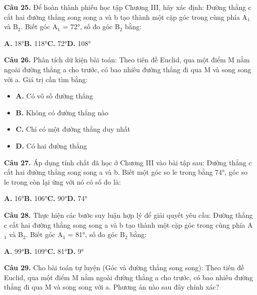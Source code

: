 \documentclass[11pt,a4paper]{article}
\begin{document}
\textbf{\color{primary} Câu 25.} Để hoàn thành phiếu học tập Chương III, hãy xác định: Đường thẳng c cắt hai đường thẳng song song a và b tạo thành một cặp góc trong cùng phía A$_1$ và B$_2$. Biết góc A$_1$ = 72°, số đo góc B$_2$ bằng:\par
\hspace*{1.5em}\textbf{A.} 18°\quad\quad \textbf{B.} 118°\quad\quad \textbf{C.} 72°\quad\quad \textbf{D.} 108°\par\vspace{2pt}
\textbf{\color{primary} Câu 26.} Phân tích dữ kiện bài toán: Theo tiên đề Euclid, qua một điểm M nằm ngoài đường thẳng a cho trước, có bao nhiêu đường thẳng đi qua M và song song với a. Giá trị cần tìm bằng:\par
\begin{itemize}\setlength{\itemsep}{1pt}\setlength{\parskip}{0pt}
  \item[] \textbf{A.} Có vô số đường thẳng
  \item[] \textbf{B.} Không có đường thẳng nào
  \item[] \textbf{C.} Chỉ có một đường thẳng duy nhất
  \item[] \textbf{D.} Có hai đường thẳng
\end{itemize}\vspace{2pt}
\textbf{\color{primary} Câu 27.} Áp dụng tính chất đã học ở Chương III vào bài tập sau: Đường thẳng c cắt hai đường thẳng song song a và b. Biết một góc so le trong bằng 74°, góc so le trong còn lại ứng với nó có số đo là:\par
\hspace*{1.5em}\textbf{A.} 16°\quad\quad \textbf{B.} 106°\quad\quad \textbf{C.} 90°\quad\quad \textbf{D.} 74°\par\vspace{2pt}
\textbf{\color{primary} Câu 28.} Thực hiện các bước suy luận hợp lý để giải quyết yêu cầu: Đường thẳng c cắt hai đường thẳng song song a và b tạo thành một cặp góc trong cùng phía A$_1$ và B$_2$. Biết góc A$_1$ = 81°, số đo góc B$_2$ bằng:\par
\hspace*{1.5em}\textbf{A.} 99°\quad\quad \textbf{B.} 109°\quad\quad \textbf{C.} 81°\quad\quad \textbf{D.} 9°\par\vspace{2pt}
\textbf{\color{primary} Câu 29.} Cho bài toán tự luyện (Góc và đường thẳng song song): Theo tiên đề Euclid, qua một điểm M nằm ngoài đường thẳng a cho trước, có bao nhiêu đường thẳng đi qua M và song song với a. Phương án nào sau đây chính xác?\par
\end{document}
